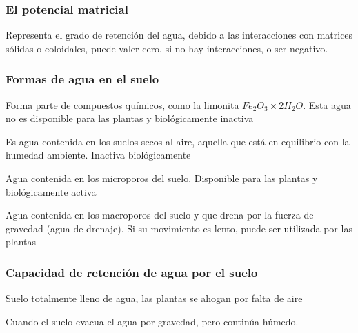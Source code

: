 \subsubsection{El potencial matricial}

Representa el grado de retención del agua, debido a las interacciones con matrices sólidas o coloidales, puede valer cero, si no hay interacciones, o ser negativo.

\subsubsection{Formas de agua en el suelo}

\begin{definition}
    Forma parte de compuestos químicos, como la limonita $Fe_2O_3\times 2H_2O$. Esta agua no es disponible para las plantas y biológicamente inactiva
\end{definition}

\begin{definition}
    Es agua contenida en los suelos secos al aire, aquella que está en equilibrio con la humedad ambiente. Inactiva biológicamente
\end{definition}

\begin{definition}
    Agua contenida en los microporos del suelo. Disponible para las plantas y biológicamente activa
\end{definition}

\begin{definition}
    Agua contenida en los macroporos del suelo y que drena por la fuerza de gravedad (agua de drenaje). Si su movimiento es lento, puede ser utilizada por las plantas
\end{definition}

\subsubsection{Capacidad de retención de agua por el suelo}

\begin{definition}[Saturación]
    Suelo totalmente lleno de agua, las plantas se ahogan por falta de aire
\end{definition}

\begin{definition}
    Cuando el suelo evacua el agua por gravedad, pero continúa húmedo.
\end{definition}

